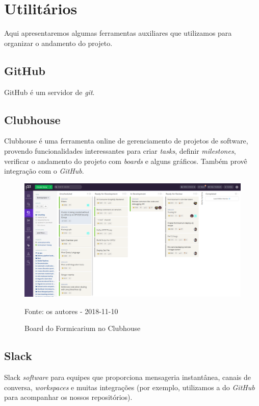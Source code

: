 \documentclass[twosideprint]{politex}
\newcommand{\legend}[1]{\begin{center}\def\caption{}\caption{#1}\end{center}}
\begin{document}
\section{Utilitários}
Aqui apresentaremos algumas ferramentas auxiliares que utilizamos para organizar o andamento do projeto.

\subsection{GitHub}
GitHub \cite{github} é um servidor de \textit{git}.

\subsection{Clubhouse}
Clubhouse \cite{clubhouse} é uma ferramenta online de gerenciamento de projetos de software, provendo funcionalidades interessantes para criar \textit{tasks}, definir \textit{milestones}, verificar o andamento do projeto com \textit{boards} e alguns gráficos. Também provê integração com o \textit{GitHub}.

\begin{figure}[htb]
    \caption{Board do Formicarium no Clubhouse}
    \begin{center}
        \includegraphics[scale=0.20]{pictures/clubhouse-fmc.png}
    \end{center}
    \label{fig:clubhouse}
    \legend{Fonte: os autores - 2018-11-10}
\end{figure}

\subsection{Slack}
Slack \cite{slack} \textit{software} para equipes que proporciona mensageria instantânea, canais de conversa, \textit{workspaces} e muitas integrações (por exemplo, utilizamos a do \textit{GitHub} para acompanhar os nossos repositórios).
\end{document}
